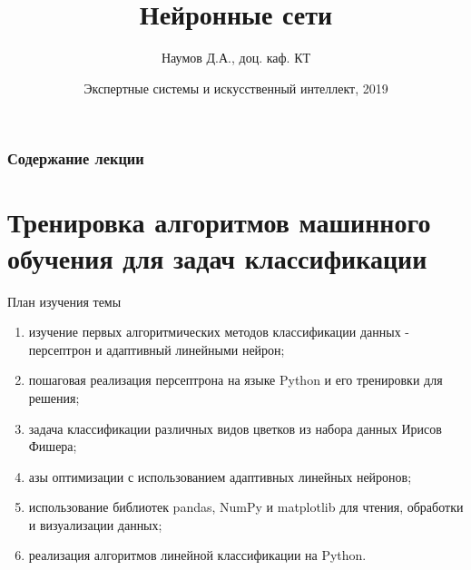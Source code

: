 \documentclass{beamer}
\title[Artifical Intelligence]{Нейронные сети}
\author{Наумов Д.А., доц. каф. КТ}
\date[11.02.2019] {Экспертные системы и искусственный интеллект, 2019}
\begin{document}
\begin{frame}
  \titlepage
\end{frame}
  
\begin{frame}
  \frametitle{Содержание лекции}
  \tableofcontents  
\end{frame}


\section{Тренировка алгоритмов машинного обучения для задач классификации}

\begin{frame}[t]{План изучения темы}
\begin{enumerate}
\item изучение первых алгоритмических методов классификации данных - персептрон и адаптивный линейными нейрон; 
\item пошаговая реализация персептрона на языке Python и его тренировки для решения;
\item задача классификации различных видов цветков из набора данных Ирисов Фишера;
\item азы оптимизации с использованием адаптивных линейных нейронов;
\item использование библиотек pandas, NumPy и matplotlib для чтения, обработки
и визуализации данных;
\item реализация алгоритмов линейной классификации на Python.
\end{enumerate}
\end{frame}
\end{document}
